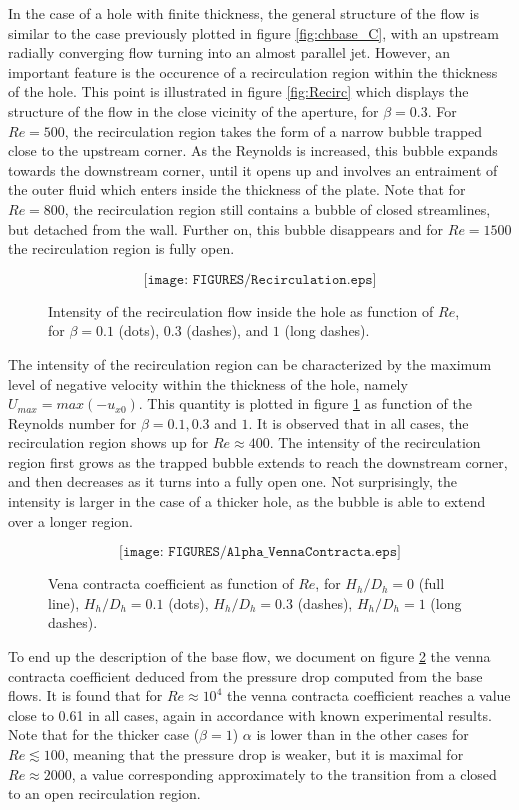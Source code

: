 \documentclass{jfm}
\begin{document}
In the case of a hole with finite thickness, the general structure of the flow is similar to the case previously plotted in figure \ref{fig:chbase_C}, with an upstream radially converging flow turning into an almost parallel jet. However, an important feature is the occurence of a recirculation region within the thickness of the hole. This point is illustrated in figure \ref{fig:Recirc} which displays the structure of the flow in the close vicinity of the aperture, for $\beta = 0.3$. For $Re = 500$, the recirculation region takes the form of a narrow bubble trapped close to the upstream corner. As the Reynolds is increased, this bubble expands towards the downstream corner, until it opens up and involves an entraiment of the outer fluid which enters inside the thickness of the plate. Note that for $Re = 800$, the recirculation region still contains a bubble of closed streamlines, but detached from the wall. Further on, this bubble disappears and for $Re = 1500$ the recirculation region is fully open.


\begin{figure}
$$
\texttt{[image: FIGURES/Recirculation.eps]}
$$
\caption{ Intensity of the recirculation flow inside the hole as function of $Re$, 
for $\beta = 0.1$ (dots),  $0.3$ (dashes),  and $1$ (long dashes). }
\label{fig:Umax}
\end{figure}

The intensity of the recirculation region can be characterized by the maximum level of negative velocity within the thickness of the hole, namely $U_{max} = max (-u_{x0})$. This quantity is plotted in figure \ref{fig:Umax} as function of the Reynolds number for $\beta = 0.1, 0.3$ and $1$. It is observed that in all cases, the recirculation region shows up for $Re \approx 400$. The intensity of the recirculation region first grows as the trapped bubble extends to reach the downstream corner, and then decreases as it turns into a fully open one. Not surprisingly, the intensity is larger in the case of a thicker hole, as the bubble is able to extend over a longer region.




\begin{figure}
$$
\texttt{[image: FIGURES/Alpha\_VennaContracta.eps]}
$$
\caption{ Vena contracta coefficient as function of $Re$, for $H_h/D_h = 0$ (full line), 
 $H_h/D_h = 0.1$ (dots),  $H_h/D_h = 0.3$ (dashes),  $H_h/D_h = 1$ (long dashes). }
\label{fig:alpha}
\end{figure}

To end up the description of the base flow, we document on figure \ref{fig:alpha} the venna contracta coefficient
deduced from the pressure drop computed from the base flows. It is found that for $Re \approx 10^4$ the venna contracta coefficient reaches a value close to 0.61 in all cases, again in accordance with known experimental results. Note that for the thicker case ($\beta=1$) $\alpha$ is lower than in the other cases for $Re \lesssim 100$, 
meaning that the pressure drop is weaker, but it is maximal for $Re \approx 2000$, a value corresponding approximately to the transition from a closed to an open recirculation region.
\end{document}
